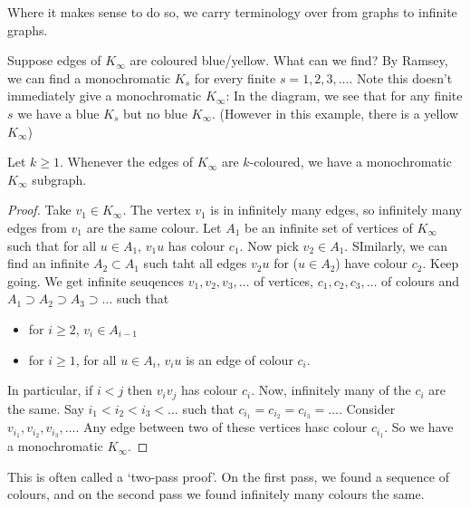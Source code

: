\documentclass{article}
\begin{document}

Where it makes sense to do so, we carry terminology over from graphs to infinite graphs.

Suppose edges of $K_\infty$ are coloured blue/yellow. What can we find? By Ramsey, we can find a monochromatic $K_s$ for every finite $s = 1, 2, 3, \dotsc$. Note this doesn't immediately give a monochromatic $K_\infty$:
In the diagram, we see that for any finite $s$ we have a blue $K_s$ but no blue $K_\infty$.  (However in this example, there is a yellow $K_\infty$)

\begin{nthm}\label{thm:infRamsey}
    Let $k \geq 1$. Whenever the edges of $K_\infty$ are $k$-coloured, we have a monochromatic $K_\infty$ subgraph.
\end{nthm}

\begin{proof}
    Take $v_1 \in K_\infty$.  The vertex $v_1$ is in infinitely many edges, so infinitely many edges from $v_1$ are the same colour.
    Let $A_1$ be an infinite set of vertices of $K_\infty$ such that for all $u \in A_1$, $v_1 u$ has colour $c_1$.
    Now pick $v_2 \in A_1$. SImilarly, we can find an infinite $A_2 \subset A_1$ such taht all edges $v_2 u$ for ($u \in A_2$) have colour $c_2$.
    Keep going. We get infinite seuqences $v_1, v_2, v_3, \dotsc$ of vertices, $c_1, c_2, c_3, \dotsc$ of colours and $A_1 \supset A_2 \supset A_3 \supset \dots$ such that
    \begin{itemize}
        \item for $i \geq 2$, $v_i \in A_{i-1}$
        \item for $i \geq 1$, for all $u \in A_i$, $v_i u$ is an edge of colour $c_i$.
    \end{itemize}
    In particular, if $i < j$ then $v_i v_j$ has colour $c_i$. Now, infinitely many of the $c_i$ are the same.
    Say $i_1 < i_2 < i_3 < \dots$ such that $c_{i_1} = c_{i_2} = c_{i_3} = \dotsc$.
    Consider $v_{i_1}, v_{i_2}, v_{i_3}, \dotsc$. Any edge between two of these vertices hasc colour $c_{i_1}$. So we have a monochromatic $K_\infty$.
\end{proof}

\begin{remark}
    This is often called a `two-pass proof'. On the first pass, we found a sequence of colours, and on the second pass we found infinitely many colours the same.
\end{remark}
\end{document}
